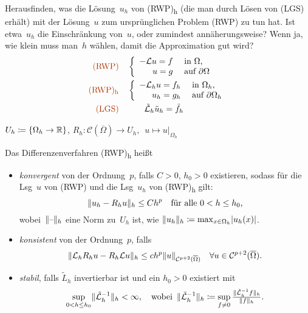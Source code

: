 \documentclass{cheat-sheet}
\newcommand{\Cont}{\mathcal{C}} %
\newcommand{\clos}[1]{\overline{#1}} %
\newcommand{\cOmega}{\clos{\Omega}} %
\newcommand{\bOmega}{\partial \Omega} %
\newcommand{\LL}{\mathcal{L}} %
\newcommand{\tss}[1]{\textsubscript{#1}} %
\newcommand{\probl}[1]{\textcolor{ProblemColor}{#1}}
\begin{document}
\begin{ziel}
  Herausfinden, was die Lösung~$u_h$ von (RWP)\tss{h} (die man durch Lösen von (LGS) erhält) mit der Lösung~$u$ zum ursprünglichen Problem (RWP) zu tun hat.
  Ist etwa~$u_h$ die Einschränkung von~$u$, oder zumindest annäherungsweise?
  Wenn ja, wie klein muss man~$h$ wählen, damit die Approximation gut wird?
  \begin{align*}
    \text{\probl{(RWP)}} \quad
    & \left\{ \begin{array}{rl}
      - \LL u = f &\text{ in $\Omega$,} \\
      u = g &\text{ auf $\bOmega$}
    \end{array} \right. \\
    \text{\probl{(RWP)\tss{h}}} \quad
    & \left\{ \begin{array}{rl}
      - \LL_h u = f_h &\text{ in $\Omega_h$,} \\
      u_h = g_h &\text{ auf $\bOmega_h$}
    \end{array} \right. \\
    \text{\probl{(LGS)}} \quad
    & \qquad \tilde{\LL}_h \tilde{u}_h = \tilde{f}_h
  \end{align*}
\end{ziel}

\begin{nota}
  $U_h \coloneqq \{ \Omega_h \to \mathbb{R} \}$, \quad
  $R_h : \Cont(\cOmega) \to U_h, \enspace u \mapsto u|_{\Omega_h}$
\end{nota}

\begin{defn}
  Das Differenzenverfahren (RWP)\tss{h} heißt
  \begin{itemize}
    \item \emph{konvergent} von der Ordnung~$p$, falls $C > 0$, $h_0 > 0$ existieren, sodass für die Lsg~$u$ von (RWP) und die Lsg~$u_h$ von (RWP)\tss{h} gilt:
    \[
      \lVert u_h - R_h u\rVert_h \leq C h^p \quad
      \text{für alle $0 < h \leq h_0$,}
    \]
    wobei~$\lVert\text{--}\rVert_h$ eine Norm zu~$U_h$ ist, wie \zB{} $\lVert u_h\rVert_h \coloneqq \max_{x \in \Omega_h} \lvert u_h(x)\rvert$.
    \item \emph{konsistent} von der Ordnung~$p$, falls
    \[
      \norm{\LL_h R_h u - R_h \LL u}_h \leq c h^p \norm{u}_{\Cont^{p+2}(\cOmega)} \quad
      \forall u \in \Cont^{p+2}(\cOmega).
    \]
    \item \emph{stabil}, falls $\tilde{L}_h$ invertierbar ist und ein $h_0 > 0$ existiert mit
    \[
      \sup_{0 < h \leq h_0} \norm{\tilde{\LL}_h^{-1}}_h < \infty, \quad
      \text{wobei} \enspace
      \norm{\tilde{\LL}_h^{-1}}_h \coloneqq \sup_{f \neq 0} \tfrac{\norm{\tilde{\LL}^{-1}_h f}_h}{\norm{f}_h}.
    \]
  \end{itemize}
\end{defn}
\end{document}
